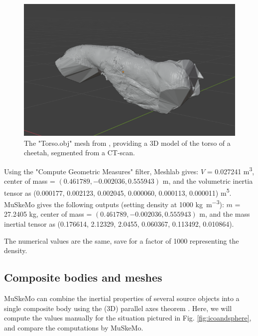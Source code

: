 \documentclass{article}
\begin{document}
\begin{figure}[htbp]
    \centering
    \includegraphics[width=\textwidth]{figures/cheetah_hull.png} %
    \caption{The "Torso.obj" mesh from \cite{coathamConvexHullEstimation2021}, providing a 3D model of the torso of a cheetah, segmented from a CT-scan.}
    \label{fig:cheetahhull}
\end{figure}

Using the "Compute Geometric Measures" filter, Meshlab gives: \(V\) = 0.027241 \si{m^3}, center of mass = \((0.461789, -0.002036, 0.555943)\) \si{m}, and the volumetric inertia tensor as (0.000177, 0.002123, 0.002045, 0.000060, 0.000113, 0.000011) \si{m^5}. MuSkeMo gives the following outputs (setting density at 1000 \si{kg m^{-3}}): \(m\) = 27.2405 \si{kg}, center of mass = \((0.461789, -0.002036, 0.555943)\) \si{m}, and the mass inertial tensor as (0.176614, 2.12329, 2.0455, 0.060367, 0.113492, 0.010864).

The numerical values are the same, save for a factor of 1000 representing the density.

\subsection{Composite bodies and meshes}

\label{sec:compositebodyvalidation}

MuSkeMo can combine the inertial properties of several source objects into a single composite body using the (3D) parallel axes theorem \cite{valleryAdvancedDynamics2019,ruinaMechanicsToolsetStatics2019}. Here, we will compute the values manually for the situation pictured in Fig. \ref{fig:icoandsphere}, and compare the computations by MuSkeMo.
\end{document}
